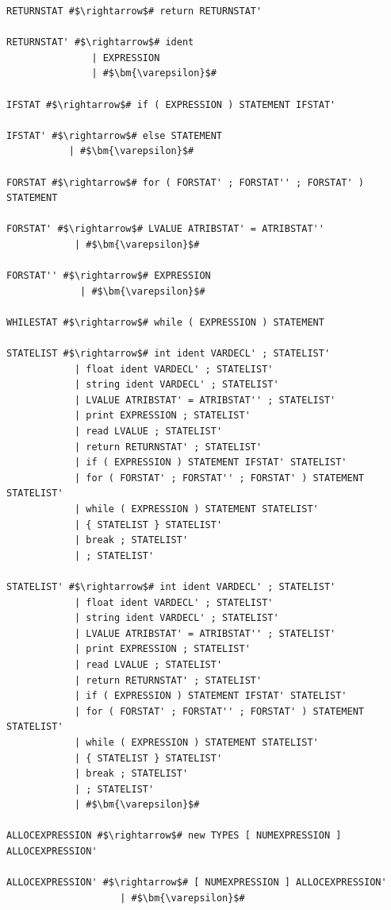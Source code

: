 \documentclass[
	12pt,				%
	openright,			%
	twoside,			%
	a4paper,			%
	english,			%
	french,				%
	spanish,			%
	brazil				%
	]{abntex2}
\begin{document}
\begin{lstlisting}[escapechar=\#]
RETURNSTAT #$\rightarrow$# return RETURNSTAT' 

RETURNSTAT' #$\rightarrow$# ident 
               | EXPRESSION 
               | #$\bm{\varepsilon}$# 

IFSTAT #$\rightarrow$# if ( EXPRESSION ) STATEMENT IFSTAT' 

IFSTAT' #$\rightarrow$# else STATEMENT 
           | #$\bm{\varepsilon}$# 

FORSTAT #$\rightarrow$# for ( FORSTAT' ; FORSTAT'' ; FORSTAT' ) STATEMENT 

FORSTAT' #$\rightarrow$# LVALUE ATRIBSTAT' = ATRIBSTAT'' 
            | #$\bm{\varepsilon}$# 

FORSTAT'' #$\rightarrow$# EXPRESSION 
             | #$\bm{\varepsilon}$# 

WHILESTAT #$\rightarrow$# while ( EXPRESSION ) STATEMENT 

STATELIST #$\rightarrow$# int ident VARDECL' ; STATELIST' 
            | float ident VARDECL' ; STATELIST' 
            | string ident VARDECL' ; STATELIST' 
            | LVALUE ATRIBSTAT' = ATRIBSTAT'' ; STATELIST' 
            | print EXPRESSION ; STATELIST' 
            | read LVALUE ; STATELIST' 
            | return RETURNSTAT' ; STATELIST' 
            | if ( EXPRESSION ) STATEMENT IFSTAT' STATELIST' 
            | for ( FORSTAT' ; FORSTAT'' ; FORSTAT' ) STATEMENT STATELIST' 
            | while ( EXPRESSION ) STATEMENT STATELIST' 
            | { STATELIST } STATELIST' 
            | break ; STATELIST' 
            | ; STATELIST' 

STATELIST' #$\rightarrow$# int ident VARDECL' ; STATELIST' 
            | float ident VARDECL' ; STATELIST' 
            | string ident VARDECL' ; STATELIST' 
            | LVALUE ATRIBSTAT' = ATRIBSTAT'' ; STATELIST' 
            | print EXPRESSION ; STATELIST' 
            | read LVALUE ; STATELIST' 
            | return RETURNSTAT' ; STATELIST' 
            | if ( EXPRESSION ) STATEMENT IFSTAT' STATELIST' 
            | for ( FORSTAT' ; FORSTAT'' ; FORSTAT' ) STATEMENT STATELIST' 
            | while ( EXPRESSION ) STATEMENT STATELIST' 
            | { STATELIST } STATELIST' 
            | break ; STATELIST' 
            | ; STATELIST' 
            | #$\bm{\varepsilon}$# 

ALLOCEXPRESSION #$\rightarrow$# new TYPES [ NUMEXPRESSION ] ALLOCEXPRESSION' 

ALLOCEXPRESSION' #$\rightarrow$# [ NUMEXPRESSION ] ALLOCEXPRESSION' 
                    | #$\bm{\varepsilon}$# 


\end{lstlisting}
\end{document}
